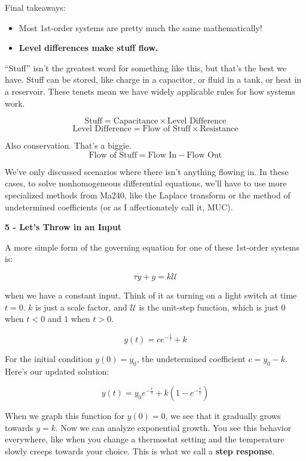 \documentclass{article}
\newcommand{\UnitStep}{\mathscr{U}}
\begin{document}
\begin{onehalfspacing}
\begin{flushleft}
\medskip

Final takeaways:
\begin{itemize}[noitemsep,topsep=0.5pt]
    \item Most 1st-order systems are pretty much the same mathematically!
    \item \textbf{Level differences make stuff flow.}
\end{itemize}

\medskip

``Stuff'' isn't the greatest word for something like this, but that's the best we have. Stuff can be stored, like charge in a capacitor, or fluid in a tank, or heat in a reservoir. These tenets mean we have widely applicable rules for how systems work.

\[\text{Stuff} = \text{Capacitance} \times \text{Level Difference}\]
\[\text{Level Difference} = \text{Flow of Stuff} \times \text{Resistance}\]

Also conservation. That's a biggie.
\[\text{Flow of Stuff} = \text{Flow In} - \text{Flow Out}\]

We've only discussed scenarios where there isn't anything flowing in. In these cases, to solve nonhomogeneous differential equations, we'll have to use more specialized methods from Ma240, like the Laplace transform or the method of undetermined coefficients (or as I affectionately call it, MUC).

\bigskip
\large\textbf{5 - Let's Throw in an Input} \\
\normalsize

A more simple form of the governing equation for one of these 1st-order systems is:

\vspace{-0.1in}
\[\tau \dot{y} + y = k\UnitStep\]

when we have a constant input. Think of it as turning on a light switch at time \(t=0\). \(k\) is just a scale factor, and \(\UnitStep\) is the unit-step function, which is just \(0\) when \(t<0\) and \(1\) when \(t>0\).

\vspace{-0.1in}
\[y(t) = ce^{-\frac{t}{\tau}} + k\]

For the initial condition \(y(0) = y_0\), the undetermined coefficient \(c=y_0 - k\). Here's our updated solution:

\vspace{-0.1in}
\[y(t) = y_0 e^{-\frac{t}{\tau}} + k(1-e^{-\frac{t}{\tau}})\]

When we graph this function for \(y(0) = 0\), we see that it gradually grows towards \(y=k\). Now we can analyze exponential growth. You see this behavior everywhere, like when you change a thermostat setting and the temperature slowly creeps towards your choice. This is what we call a \textbf{step response}.


\end{flushleft}
\end{onehalfspacing}
\end{document}
